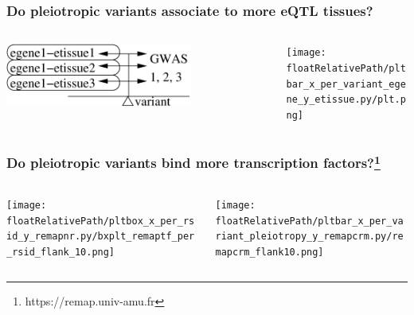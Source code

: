 \documentclass{beamer}
\newcommand*{\floatRelativePath}{../out/gwas417/pval_5e-08/r2_0.1/kb_1000/window_1000000/75_50}%
\begin{document}
    \begin{frame}
        \frametitle{Do pleiotropic variants associate to more eQTL tissues?}

        \begin{columns}
            \begin{column}{0.5\textwidth}
                \begin{center}
                    \includegraphics[width=0.7\textwidth]{../presentation_230120_gold2022_paris/fig/model_pleio_etissues.png}
                \end{center}
            \end{column}
            \begin{column}{0.5\textwidth}  %
                \begin{center}
                    \texttt{[image: \\floatRelativePath/pltbar\_x\_per\_variant\_egene\_y\_etissue.py/plt.png]}
                \end{center}
            \end{column}
        \end{columns}

    \end{frame}

    \begin{frame}
        \frametitle{Do pleiotropic variants bind more transcription factors?\footnote{https://remap.univ-amu.fr}}

        \begin{columns}
            \begin{column}{0.5\textwidth}
                \begin{center}
                    \texttt{[image: \\floatRelativePath/pltbox\_x\_per\_rsid\_y\_remapnr.py/bxplt\_remaptf\_per\_rsid\_flank\_10.png]}
                \end{center}
            \end{column}
            \begin{column}{0.5\textwidth}  %
                \begin{center}
                    \texttt{[image: \\floatRelativePath/pltbar\_x\_per\_variant\_pleiotropy\_y\_remapcrm.py/remapcrm\_flank10.png]}
                \end{center}
            \end{column}
        \end{columns}


    \end{frame}
\end{document}
